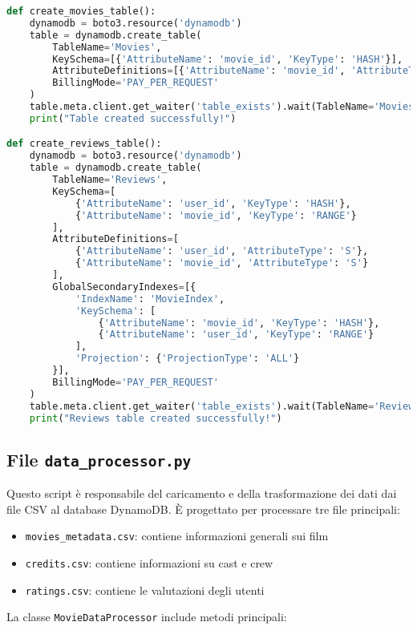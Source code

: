 \documentclass[11pt,a4paper]{article}
\begin{document}
\begin{lstlisting}[language=Python]
def create_movies_table():
    dynamodb = boto3.resource('dynamodb')
    table = dynamodb.create_table(
        TableName='Movies',
        KeySchema=[{'AttributeName': 'movie_id', 'KeyType': 'HASH'}],
        AttributeDefinitions=[{'AttributeName': 'movie_id', 'AttributeType': 'S'}],
        BillingMode='PAY_PER_REQUEST'
    )
    table.meta.client.get_waiter('table_exists').wait(TableName='Movies')
    print("Table created successfully!")

def create_reviews_table():
    dynamodb = boto3.resource('dynamodb')
    table = dynamodb.create_table(
        TableName='Reviews',
        KeySchema=[
            {'AttributeName': 'user_id', 'KeyType': 'HASH'},
            {'AttributeName': 'movie_id', 'KeyType': 'RANGE'}
        ],
        AttributeDefinitions=[
            {'AttributeName': 'user_id', 'AttributeType': 'S'},
            {'AttributeName': 'movie_id', 'AttributeType': 'S'}
        ],
        GlobalSecondaryIndexes=[{
            'IndexName': 'MovieIndex',
            'KeySchema': [
                {'AttributeName': 'movie_id', 'KeyType': 'HASH'},
                {'AttributeName': 'user_id', 'KeyType': 'RANGE'}
            ],
            'Projection': {'ProjectionType': 'ALL'}
        }],
        BillingMode='PAY_PER_REQUEST'
    )
    table.meta.client.get_waiter('table_exists').wait(TableName='Reviews')
    print("Reviews table created successfully!")
\end{lstlisting}

\subsection{File \texttt{data\_processor.py}}
Questo script è responsabile del caricamento e della trasformazione dei dati dai file CSV al database DynamoDB. È progettato per processare tre file principali:

\begin{itemize}
  \item \texttt{movies\_metadata.csv}: contiene informazioni generali sui film
  \item \texttt{credits.csv}: contiene informazioni su cast e crew
  \item \texttt{ratings.csv}: contiene le valutazioni degli utenti
\end{itemize}

La classe \texttt{MovieDataProcessor} include metodi principali:
\end{document}
